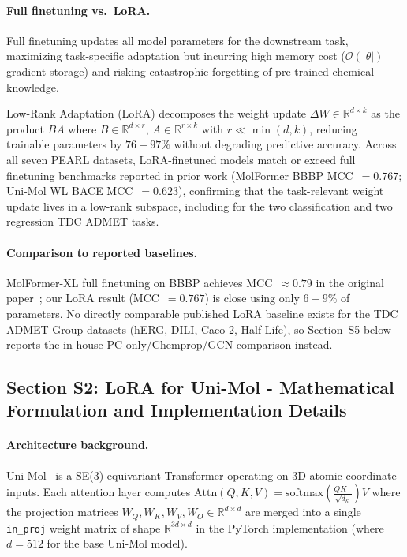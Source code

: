 \documentclass[9pt,a4paper]{article}
\begin{document}
\paragraph{Full finetuning vs.\ LoRA.}
Full finetuning updates all model parameters for the downstream task, maximizing task-specific adaptation but incurring high memory cost ($\mathcal{O}(|\theta|)$ gradient storage) and risking catastrophic forgetting of pre-trained chemical knowledge.

Low-Rank Adaptation (LoRA) decomposes the weight update $\Delta W \in \mathbb{R}^{d \times k}$
as the product $BA$ where $B \in \mathbb{R}^{d \times r}$, $A \in \mathbb{R}^{r \times k}$
with $r \ll \min(d, k)$, reducing trainable parameters by $76-97\%$ without degrading
predictive accuracy.
Across all seven PEARL datasets, LoRA-finetuned models match or exceed full finetuning
benchmarks reported in prior work (MolFormer BBBP MCC~$= 0.767$; Uni-Mol WL BACE
MCC~$= 0.623$), confirming that the task-relevant weight update lives in a low-rank
subspace, including for the two classification and two regression TDC ADMET tasks.

\paragraph{Comparison to reported baselines.}
MolFormer-XL full finetuning on BBBP achieves MCC~$\approx 0.79$ in the original paper~\cite{ross2022molformer}; our LoRA result (MCC~$= 0.767$) is close using
only $6-9\%$ of parameters.
No directly comparable published LoRA baseline exists for the TDC ADMET Group datasets
(hERG, DILI, Caco-2, Half-Life), so Section~S5 below reports the in-house
PC-only/Chemprop/GCN comparison instead.

\subsection*{Section S2: LoRA for Uni-Mol - Mathematical Formulation and
Implementation Details}

\paragraph{Architecture background.}
Uni-Mol~\cite{zhou2023unimol} is a SE(3)-equivariant Transformer operating on
3D atomic coordinate inputs.
Each attention layer computes
$\text{Attn}(Q, K, V) = \text{softmax}\!\left(\tfrac{QK^\top}{\sqrt{d_k}}\right)V$
where the projection matrices $W_Q, W_K, W_V, W_O \in \mathbb{R}^{d \times d}$
are merged into a single \texttt{in\_proj} weight matrix of shape
$\mathbb{R}^{3d \times d}$ in the PyTorch implementation
(where $d = 512$ for the base Uni-Mol model).
\end{document}
